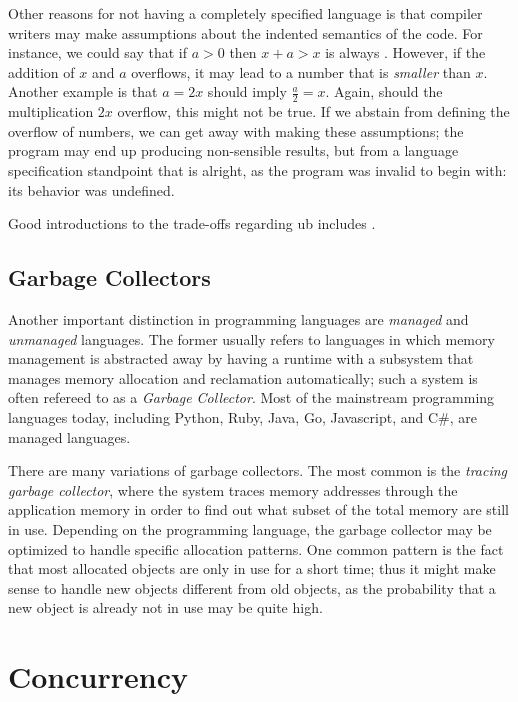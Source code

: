 Other reasons for not having a completely specified language is that compiler writers may make
assumptions about the indented semantics of the code. For instance, we could say that if $a > 0$
then $x + a > x$ is always . However, if the addition of $x$ and $a$ overflows, it may
lead to a number that is \emph{smaller} than $x$. Another example is that $a = 2x$ should imply
$\frac{a}{2} = x$. Again, should the multiplication $2x$ overflow, this might not be true.
If we abstain from defining the overflow of numbers, we can get away with making these assumptions;
the program may end up producing non-sensible results, but from a language specification standpoint
that is alright, as the program was invalid to begin with: its behavior was undefined.

Good introductions to the trade-offs regarding \gls{ub} includes
\cite{regehr2017undefined,carruth2016garbage}.



\subsection{Garbage Collectors}

Another important distinction in programming languages are \emph{managed} and \emph{unmanaged}
languages. The former usually refers to languages in which memory management is abstracted away by
having a runtime with a subsystem that manages memory allocation and reclamation automatically; such
a system is often refereed to as a \emph{Garbage Collector}. Most of the mainstream programming
languages today, including Python, Ruby, Java, Go, Javascript, and C\#, are managed languages.

There are many variations of garbage collectors. The most common is the \emph{tracing garbage
collector}, where the system traces memory addresses through the application memory in order to
find out what subset of the total memory are still in use. Depending on the programming language,
the garbage collector may be optimized to handle specific allocation patterns. One common pattern
is the fact that most allocated objects are only in use for a short time; thus it might make sense
to handle new objects different from old objects, as the probability that a new object is already
not in use may be quite high.



\section{Concurrency}

